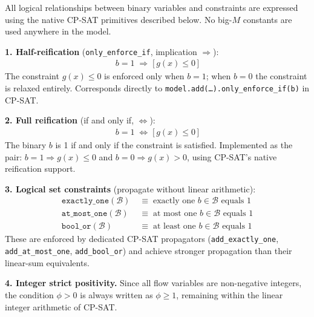 \begin{convention}
\label{conv:reif}
All logical relationships between binary variables and constraints
are expressed using the native CP-SAT primitives described below.
No big-$M$ constants are used anywhere in the model.

\medskip
\noindent\textbf{1. Half-reification} (\texttt{only\_enforce\_if},
implication $\Rightarrow$):
\begin{align*}
  b = 1 \;\Rightarrow\; \bigl[\,g(x) \leq 0\,\bigr]
\end{align*}
The constraint $g(x)\leq 0$ is enforced only when $b=1$; when
$b=0$ the constraint is relaxed entirely. Corresponds directly
to \texttt{model.add(\ldots).only\_enforce\_if(b)} in CP-SAT.

\medskip
\noindent\textbf{2. Full reification} (if and only if,
$\Leftrightarrow$):
\begin{align*}
  b = 1 \;\Leftrightarrow\; \bigl[\,g(x) \leq 0\,\bigr]
\end{align*}
The binary $b$ is 1 if and only if the constraint is satisfied.
Implemented as the pair:
$b=1\Rightarrow g(x)\leq 0$ and $b=0\Rightarrow g(x)>0$,
using CP-SAT's native reification support.

\medskip
\noindent\textbf{3. Logical set constraints} (propagate without
linear arithmetic):
\begin{align*}
  \texttt{exactly\_one}(\mathcal{B})
    &\;\equiv\;
    \text{exactly one } b\in\mathcal{B} \text{ equals } 1 \\
  \texttt{at\_most\_one}(\mathcal{B})
    &\;\equiv\;
    \text{at most one } b\in\mathcal{B} \text{ equals } 1 \\
  \texttt{bool\_or}(\mathcal{B})
    &\;\equiv\;
    \text{at least one } b\in\mathcal{B} \text{ equals } 1
\end{align*}
These are enforced by dedicated CP-SAT propagators
(\texttt{add\_exactly\_one}, \texttt{add\_at\_most\_one},
\texttt{add\_bool\_or}) and achieve stronger propagation
than their linear-sum equivalents.

\medskip
\noindent\textbf{4. Integer strict positivity.}
Since all flow variables are non-negative integers, the
condition $\phi > 0$ is always written as $\phi \geq 1$,
remaining within the linear integer arithmetic of CP-SAT.
\end{convention}



